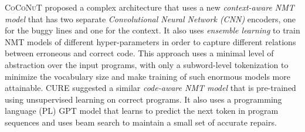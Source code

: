 %
\textsc{CoCoNuT} \citep{Lutellier2020} proposed a complex architecture that uses
a new \emph{context-aware NMT model} that has two separate \emph{Convolutional
Neural Network (CNN)} encoders, one for the buggy lines and one for the context.
It also uses \emph{ensemble learning} to train NMT models of different
hyper-parameters in order to capture different relations between erroneous and
correct code. This approach uses a minimal level of abstraction over the input
programs, with only a subword-level tokenization to minimize the vocabulary size
and make training of such enormous models more attainable. \textsc{CURE}
\citep{Jiang_2021} suggested a similar \emph{code-aware NMT model} that is
pre-trained using unsupervised learning on correct programs. It also uses a
programming language (PL) \textsc{GPT} \citep{GPT2020} model that learns to
predict the next token in program sequences and uses beam search to maintain a
small set of accurate repairs.
